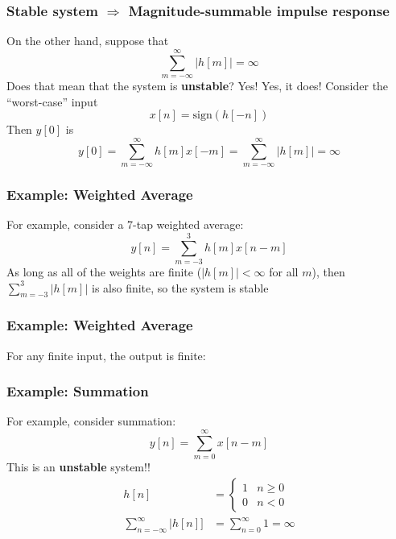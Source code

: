 \documentclass{beamer}
\begin{document}
\begin{frame}
  \frametitle{Stable system $\Rightarrow$ Magnitude-summable impulse response}

  On the other hand, suppose that 
  \begin{displaymath}
    \sum_{m=-\infty}^\infty |h[m]|=\infty
  \end{displaymath}
  Does that mean that the system is {\bf unstable}?  Yes!  Yes, it
  does!  Consider the ``worst-case'' input
  \begin{displaymath}
    x[n] = \mbox{sign}\left(h[-n]\right)
  \end{displaymath}
  Then $y[0]$ is
  \begin{displaymath}
    y[0] = \sum_{m=-\infty}^\infty h[m] x[-m] = \sum_{m=-\infty}^\infty |h[m]|=\infty
  \end{displaymath}
\end{frame}

\begin{frame}
  \frametitle{Example: Weighted Average}

  For example, consider a 7-tap weighted average:
  \begin{displaymath}
    y[n] = \sum_{m=-3}^3 h[m] x[n-m]
  \end{displaymath}
  As long as all of the weights are finite ($|h[m]|<\infty$ for all
  $m$), then $\sum_{m=-3}^3 |h[m]|$ is also finite, so the system is
  stable
\end{frame}

\begin{frame}
  \frametitle{Example: Weighted Average}

  For any finite input, the output is finite:
  \centerline{}
\end{frame}

\begin{frame}
  \frametitle{Example: Summation}

  For example, consider summation:
  \begin{displaymath}
    y[n] = \sum_{m=0}^\infty x[n-m]
  \end{displaymath}
  This is an {\bf unstable} system!!
  \begin{align*}
    h[n] &= \left\{\begin{array}{ll}1 & n\ge 0\\0 & n<0\end{array}\right.\\
    \sum_{n=-\infty}^\infty |h[n]] &=\sum_{n=0}^\infty 1 = \infty
  \end{align*}
\end{frame}
\end{document}
